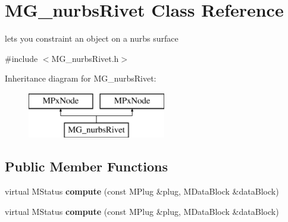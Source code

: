 \hypertarget{class_m_g__nurbs_rivet}{\section{M\-G\-\_\-nurbs\-Rivet Class Reference}
\label{class_m_g__nurbs_rivet}
}


lets you constraint an object on a nurbs surface  




{\ttfamily \#include $<$M\-G\-\_\-nurbs\-Rivet.\-h$>$}

Inheritance diagram for M\-G\-\_\-nurbs\-Rivet\-:\begin{figure}[H]
\begin{center}
\leavevmode
\includegraphics[height=2.000000cm]{class_m_g__nurbs_rivet}
\end{center}
\end{figure}
\subsection*{Public Member Functions}
\begin{DoxyCompactItemize}
\item 
\hypertarget{class_m_g__nurbs_rivet_af5e330b27dcb22d5baeb8787b0c36f6b}{virtual M\-Status {\bfseries compute} (const M\-Plug \&plug, M\-Data\-Block \&data\-Block)}\label{class_m_g__nurbs_rivet_af5e330b27dcb22d5baeb8787b0c36f6b}

\item 
\hypertarget{class_m_g__nurbs_rivet_af5e330b27dcb22d5baeb8787b0c36f6b}{virtual M\-Status {\bfseries compute} (const M\-Plug \&plug, M\-Data\-Block \&data\-Block)}\label{class_m_g__nurbs_rivet_af5e330b27dcb22d5baeb8787b0c36f6b}

\end{DoxyCompactItemize}
